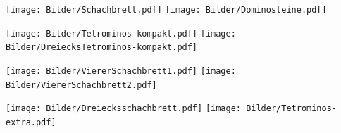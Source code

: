 \documentclass[a4paper,ngerman,12pt]{scrartcl}
\theoremstyle{definition}
\theoremstyle{plain}
\theoremstyle{remark}
\begin{document}
\newpage

\texttt{[image: Bilder/Schachbrett.pdf]}
\texttt{[image: Bilder/Dominosteine.pdf]}

\texttt{[image: Bilder/Tetrominos-kompakt.pdf]}
\texttt{[image: Bilder/DreiecksTetrominos-kompakt.pdf]}

\texttt{[image: Bilder/ViererSchachbrett1.pdf]}
\texttt{[image: Bilder/ViererSchachbrett2.pdf]}

\texttt{[image: Bilder/Dreiecksschachbrett.pdf]}
\texttt{[image: Bilder/Tetrominos-extra.pdf]}
\end{document}
